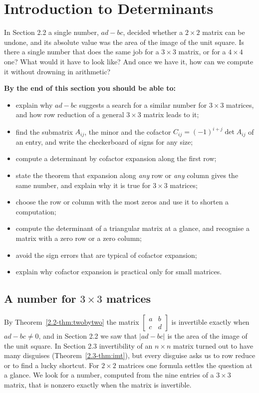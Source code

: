 \documentclass[11pt]{article}
\begin{document}
\section{Introduction to Determinants}

\begin{guide}
In Section 2.2 a single number, $ad-bc$, decided whether a $2\times2$ matrix can be undone, and its absolute value was the area of the image of the unit square. Is there a single number that does the same job for a $3\times3$ matrix, or for a $4\times4$ one? What would it have to look like? And once we have it, how can we compute it without drowning in arithmetic?
\end{guide}

\textbf{By the end of this section you should be able to:}
\begin{itemize}
  \item explain why $ad-bc$ suggests a search for a similar number for $3\times3$ matrices, and how row reduction of a general $3\times3$ matrix leads to it;
  \item find the submatrix $A_{ij}$, the minor and the cofactor $C_{ij}=(-1)^{i+j}\det A_{ij}$ of an entry, and write the checkerboard of signs for any size;
  \item compute a determinant by cofactor expansion along the first row;
  \item state the theorem that expansion along \emph{any} row or \emph{any} column gives the same number, and explain why it is true for $3\times3$ matrices;
  \item choose the row or column with the most zeros and use it to shorten a computation;
  \item compute the determinant of a triangular matrix at a glance, and recognise a matrix with a zero row or a zero column;
  \item avoid the sign errors that are typical of cofactor expansion;
  \item explain why cofactor expansion is practical only for small matrices.
\end{itemize}

\subsection*{A number for $3\times3$ matrices}

By Theorem~\ref{2.2-thm:twobytwo} the matrix $\begin{bmatrix}a&b\\c&d\end{bmatrix}$ is invertible exactly when $ad-bc\neq0$, and in Section 2.2 we saw that $|ad-bc|$ is the area of the image of the unit square. In Section 2.3 invertibility of an $n\times n$ matrix turned out to have many disguises (Theorem~\ref{2.3-thm:imt}), but every disguise asks us to row reduce or to find a lucky shortcut. For $2\times2$ matrices one formula settles the question at a glance. We look for a number, computed from the nine entries of a $3\times3$ matrix, that is nonzero exactly when the matrix is invertible.
\end{document}

